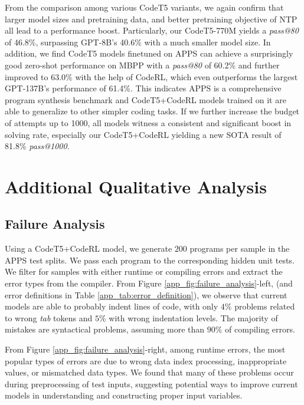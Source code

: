 \documentclass{article}
\begin{document}
From the comparison among various CodeT5 variants, we again confirm  that larger model sizes and pretraining data, and better pretraining objective of NTP all lead to a performance boost. Particularly, our CodeT5-770M yields a \emph{pass@80} of 46.8\%, surpassing GPT-8B's 40.6\% with a much smaller model size.
In addition, we find  CodeT5 models finetuned on APPS can achieve a surprisingly good zero-shot performance on MBPP with a \emph{pass@80} of 60.2\% and further improved to 63.0\% with the help of CodeRL, which even outperforms the largest GPT-137B's performance of 61.4\%.
This indicates APPS is a comprehensive  program synthesis benchmark and  CodeT5+CodeRL models trained on it are able to generalize to other simpler coding tasks.
If we further increase the budget of attempts up to 1000,  all models witness a consistent and significant boost in solving rate, especially our  CodeT5+CodeRL  yielding a new SOTA result of 81.8\% \emph{pass@1000}.

\section{Additional Qualitative Analysis}
\subsection{Failure Analysis} 
\label{app_sec:failure_analysis}

Using a CodeT5+CodeRL model, we generate $200$ programs per sample in the APPS test splits.
We pass each program to the corresponding hidden unit tests.
We filter for samples with either runtime or compiling errors and extract the error types from the compiler.
From Figure \ref{app_fig:failure_analysis}-left, (and error definitions in Table \ref{app_tab:error_definition}), we observe that current models are able to probably indent lines of code, with only $4\%$ problems related to wrong \emph{tab} tokens and $5\%$ with wrong indentation levels. 
The majority of mistakes are syntactical problems, assuming more than $90\%$ of compiling errors. 

From Figure \ref{app_fig:failure_analysis}-right, among runtime errors, the most popular types of errors are due to wrong data index processing, inappropriate values, or mismatched data types. 
We found that many of these problems occur during preprocessing of test inputs, suggesting potential ways to improve current models in understanding and constructing proper input variables.
\end{document}
